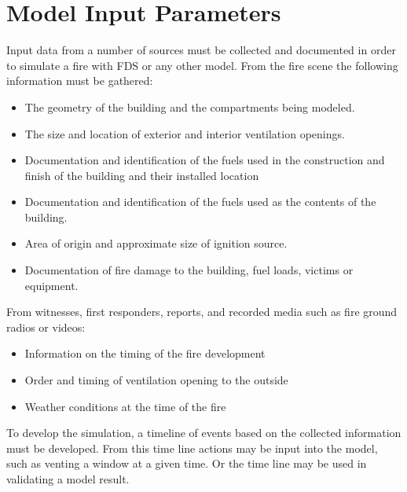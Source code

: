 \documentclass[11pt,oneside]{book}
\begin{document}
\chapter{Model Input Parameters}
Input data from a number of sources must be collected and documented in order to simulate a fire with FDS or any other model. 
From the fire scene the following information must be gathered:
\begin{itemize}
\item The geometry of the building and the compartments being modeled.
\item The size and location of exterior and interior ventilation openings. 
\item Documentation and identification of the fuels used in the construction and finish of the building and their installed location
\item Documentation and identification of the fuels used as the contents of the building. 
\item Area of origin and approximate size of ignition source.
\item Documentation of fire damage to the building, fuel loads, victims or equipment.
\end{itemize}
From witnesses, first responders, reports, and recorded media such as fire ground radios or videos:
\begin{itemize}
\item Information on the timing of the fire development
\item Order and timing of ventilation opening to the outside
\item Weather conditions at the time of the fire
\end{itemize}
To develop the simulation, a timeline of events based on the collected information must be developed.   From this time line actions may be input into the model, such as venting a window at a given time.  Or the time line may be used in validating a model result.
  
\end{document}

